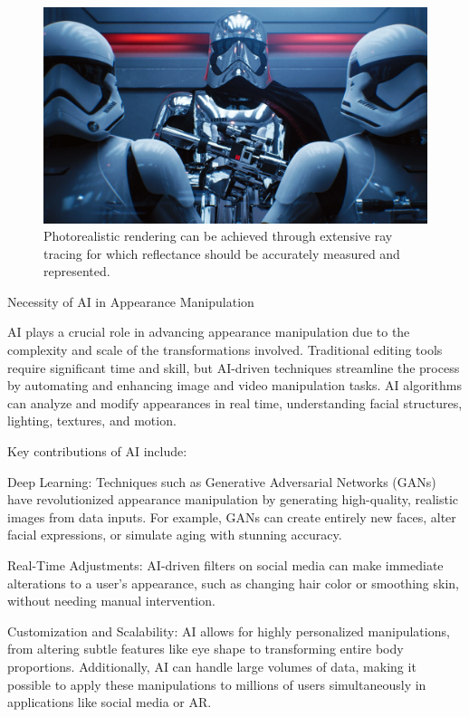 \begin{figure}[ht]
  \centering

    \includegraphics[width=\linewidth]{Images/StarWars-RayTracing.jpeg}

   \caption{Photorealistic rendering can be achieved through extensive ray tracing for which reflectance should be accurately measured and represented.}
   \label{fig:colour-approximate}
\end{figure}

Necessity of AI in Appearance Manipulation

AI plays a crucial role in advancing appearance manipulation due to the complexity and scale of the transformations involved. Traditional editing tools require significant time and skill, but AI-driven techniques streamline the process by automating and enhancing image and video manipulation tasks. AI algorithms can analyze and modify appearances in real time, understanding facial structures, lighting, textures, and motion.

Key contributions of AI include:

Deep Learning: Techniques such as Generative Adversarial Networks (GANs) have revolutionized appearance manipulation by generating high-quality, realistic images from data inputs. For example, GANs can create entirely new faces, alter facial expressions, or simulate aging with stunning accuracy.

Real-Time Adjustments: AI-driven filters on social media can make immediate alterations to a user’s appearance, such as changing hair color or smoothing skin, without needing manual intervention.

Customization and Scalability: AI allows for highly personalized manipulations, from altering subtle features like eye shape to transforming entire body proportions. Additionally, AI can handle large volumes of data, making it possible to apply these manipulations to millions of users simultaneously in applications like social media or AR.


